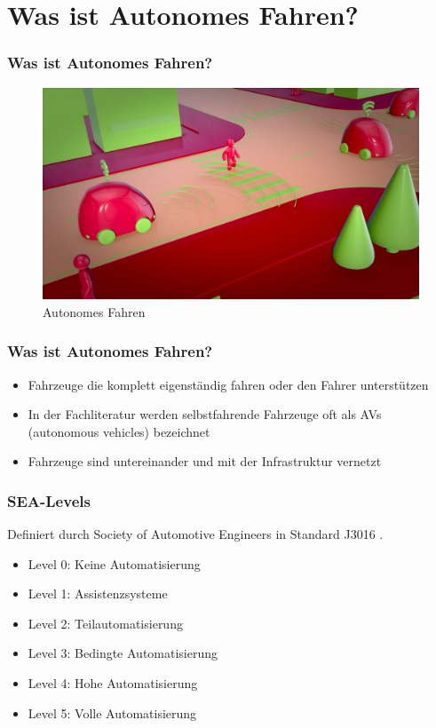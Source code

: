 \section{Was ist Autonomes Fahren?}

\begin{frame}
    \frametitle{Was ist Autonomes Fahren?}

    \begin{figure}[H]
        \centering
        \includegraphics[width=1.0\textwidth]{resources/images/car-4343633_1920.jpg}
        \caption{Autonomes Fahren \cite{car1_img}}
    \end{figure}
\end{frame}

\begin{frame}
    \frametitle{Was ist Autonomes Fahren?}
    
    \begin{itemize}
        \item Fahrzeuge die komplett eigenständig fahren oder den Fahrer unterstützen \pause
        \item In der Fachliteratur werden selbstfahrende Fahrzeuge oft als AVs (autonomous vehicles) bezeichnet \pause
        \item Fahrzeuge sind untereinander und mit der Infrastruktur vernetzt
    \end{itemize}
\end{frame}

\begin{frame}
    \frametitle{SEA-Levels}

    Definiert durch Society of Automotive Engineers \cite{websiteSAE} in Standard J3016 \cite{standardSAE}. \pause

    \begin{itemize}
        \item Level 0: Keine Automatisierung \pause
        \item Level 1: Assistenzsysteme \pause
        \item Level 2: Teilautomatisierung \pause
        \item Level 3: Bedingte Automatisierung \pause
        \item Level 4: Hohe Automatisierung \pause
        \item Level 5: Volle Automatisierung
    \end{itemize}
\end{frame}